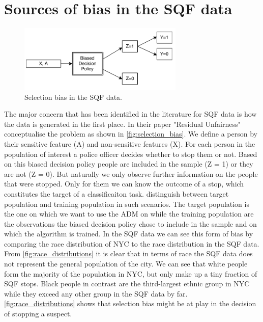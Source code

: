 \section*{Sources of bias in the SQF data}
\begin{figure}
    \includegraphics[width=0.7\textwidth]{../figures/selection_bias.png}
    \caption{Selection bias in the SQF data.}
    \label{fig:selection_bias}
\end{figure}
The major concern that has been identified in the literature for SQF data is how the data is generated in the first place. In their paper "Residual Unfairness" \cite{kallus} conceptualise the problem as shown in \autoref{fig:selection_bias}.
We define a person by their sensitive feature (A) and non-sensitive features (X). For each person in the population of interest a police officer decides whether to stop them or not. Based on this biased decision policy people are included in the sample (Z = 1) or they are not (Z = 0). But naturally we only observe further information on the people that were stopped. Only for them we can know the outcome of a stop, which constitutes the target of a classificaiton task.
\cite{kallus} distinguish between target population and training population in such scenarios. The target population is the one on which we want to use the ADM on while the training population are the observations the biased decision policy chose to include in the sample and on which the algorithm is trained.
In the SQF data we can see this form of bias by comparing the race distribution of NYC to the race distribution in the SQF data. From \autoref{fig:race_distributions} it is clear that in terms of race the SQF data does not represent the general population of the city. We can see that white people form the majority of the population in NYC, but only make up a tiny fraction of SQF stops. Black people in contrast are the third-largest ethnic group in NYC while they exceed any other group in the SQF data by far.
\autoref{fig:race_distributions} shows that selection bias might be at play in the decision of stopping a suspect.
